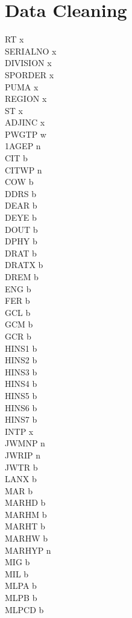 \documentclass[12pt]{article}
\begin{document}
\section{Data Cleaning}
RT x\\
SERIALNO x\\ 
DIVISION x\\
SPORDER x\\
PUMA x\\
REGION x\\
ST x\\
ADJINC x\\
PWGTP w\\
1AGEP n\\
CIT b\\
 CITWP n\\
COW b\\
DDRS b\\
DEAR b\\
DEYE b\\
DOUT b\\
DPHY b\\
DRAT b\\
DRATX b\\
DREM b\\
ENG b\\
FER b\\
GCL b\\
GCM b\\
GCR b\\
HINS1 b\\
HINS2 b\\
HINS3 b\\
HINS4 b\\
HINS5 b\\
HINS6 b\\
HINS7 b\\
INTP x\\
JWMNP n\\
JWRIP n\\
JWTR b\\
LANX b\\
MAR b\\
MARHD b\\
MARHM b\\
MARHT b\\
MARHW b\\
MARHYP n\\
MIG b\\
MIL b\\
MLPA b\\
MLPB b\\
MLPCD b\\
\end{document}
